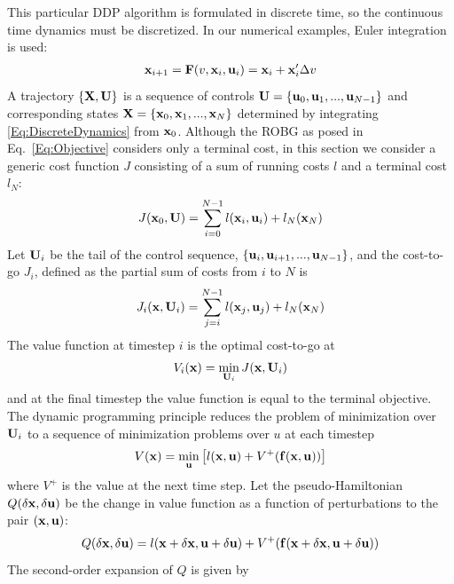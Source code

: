 This particular DDP algorithm is formulated in discrete time, so the continuous time dynamics must be discretized. In our numerical examples, Euler integration is used:
\begin{align}
	\mathbf{x}_{i+1} = \mathbf{F}(v, \mathbf{x}_i,\mathbf{u}_i) = \mathbf{x}_i + \mathbf{x}_i'\Delta v \label{Eq:DiscreteDynamics}
\end{align}
A trajectory $\{\mathbf{X},\mathbf{U}\}$ is a sequence of controls $ \mathbf{U}=\{\mathbf{u}_0,\mathbf{u}_1,...,\mathbf{u}_{N-1}\} $ and corresponding states $\mathbf{X}=\{\mathbf{x}_0,\mathbf{x}_1,...,\mathbf{x}_N\}$ determined by integrating \eqref{Eq:DiscreteDynamics} from $\mathbf{x}_0$.
Although the ROBG as posed in Eq.~\eqref{Eq:Objective} considers only a terminal cost, in this section we consider a generic cost function $J$ consisting of a sum of running costs $l$ and a terminal cost $l_N$:
\begin{align}
	J(\mathbf{x}_0,\mathbf{U}) = \sum_{i=0}^{N-1}l(\mathbf{x}_i,\mathbf{u}_i) + l_N(\mathbf{x}_N)
\end{align}
Let $\mathbf{U}_i$ be the tail of the control sequence, $\{\mathbf{u}_i,\mathbf{u}_{i+1},...,\mathbf{u}_{N-1}\}$, and the cost-to-go $J_i$, defined as the partial sum of costs from $i$ to $N$ is
\begin{align}
	J_i(\mathbf{x},\mathbf{U}_i) = \sum_{j=i}^{N-1}l(\mathbf{x}_j,\mathbf{u}_j) + l_N(\mathbf{x}_N)
\end{align}
The value function at timestep $i$ is the optimal cost-to-go at \state
\begin{align}
	V_i(\mathbf{x}) = \min_{\mathbf{U}_i} J(\mathbf{x}, \mathbf{U}_i)
\end{align}
and at the final timestep the value function is equal to the terminal objective. The dynamic programming principle reduces the problem of minimization over $\mathbf{U}_i$ to a sequence of minimization problems over $u$ at each timestep 
\begin{align}
	V(\mathbf{x}) = \min_{\mathbf{u}}\left[l(\mathbf{x},\mathbf{u}) + V^+(\mathbf{f}(\mathbf{x},\mathbf{u}))\right] \label{eq_dynamic_programming}
\end{align}
where $V^+$ is the value at the next time step.
Let the pseudo-Hamiltonian $Q(\delta\mathbf{x},\delta\mathbf{u})$ be the change in value function as a function of perturbations to the pair $(\mathbf{x},\mathbf{u})$:
\begin{align}
	Q(\delta\mathbf{x},\delta\mathbf{u}) = l(\mathbf{x}+\delta\mathbf{x},\mathbf{u}+\delta\mathbf{u}) + V^+(\mathbf{f}(\mathbf{x}+\delta\mathbf{x},\mathbf{u}+\delta\mathbf{u}))
\end{align}
The second-order expansion of $ Q $ is given by
